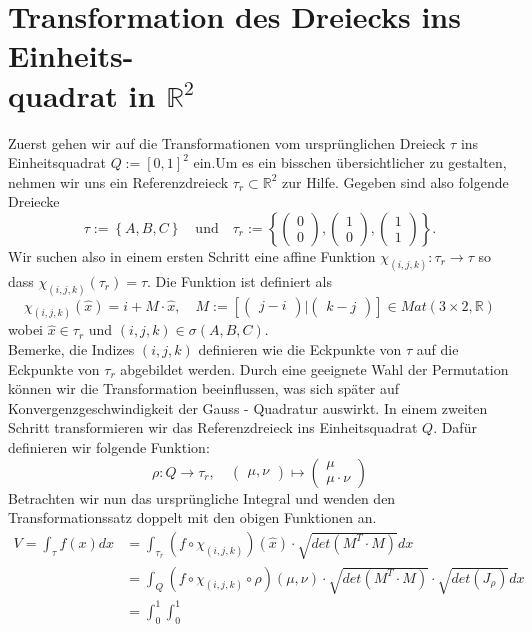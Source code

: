 \documentclass[12pt]{article}
\newcommand{\R}{\mathbb{R}}
\begin{document}
\section[Transformation des Dreiecks ins Einheitsquadrat in $\R^2$]{Transformation des Dreiecks ins Einheits-\\quadrat in $\R^2$}
Zuerst gehen wir auf die Transformationen vom ursprünglichen Dreieck $\tau$ ins Einheitsquadrat $Q:=[0,1]^2$ ein.Um es ein bisschen übersichtlicher zu gestalten, nehmen wir uns ein Referenzdreieck $\tau_r\subset\R^2$ zur Hilfe. Gegeben sind also folgende Dreiecke
\[
\tau := \left \{ A,B,C \right \}
\quad\text{und}\quad
\tau_r := \left \{ \begin{pmatrix} 0\\ 0 \end{pmatrix},
\begin{pmatrix} 1\\ 0\end{pmatrix},
\begin{pmatrix} 1\\1\end{pmatrix} \right \}.
\]
Wir suchen also in einem ersten Schritt eine affine Funktion $\chi_{(i,j,k)}:\tau_r\rightarrow\tau$ so dass $\chi_{(i,j,k)}(\tau_r)=\tau$. Die Funktion ist definiert als
\[
\chi_{(i,j,k)}(\hat{x})= i + M\cdot \hat{x}, \quad M := \left[ \begin{pmatrix} j-i \end{pmatrix} |
\begin{pmatrix} k-j \end{pmatrix} \right] \in Mat(3\times 2,\R)
\]
wobei $\hat{x}\in \tau_r$ und $(i,j,k)\in\sigma(A,B,C)$.\\
Bemerke, die Indizes $(i,j,k)$ definieren wie die Eckpunkte von $\tau$ auf die Eckpunkte von $\tau_r$ abgebildet werden. Durch eine geeignete Wahl der Permutation können wir die Transformation beeinflussen, was sich später auf Konvergenzgeschwindigkeit der Gauss - Quadratur auswirkt.
In einem zweiten Schritt transformieren wir das Referenzdreieck ins Einheitsquadrat $Q$. Dafür definieren wir folgende Funktion:
\[
\rho : Q \rightarrow \tau_r,\quad \begin{pmatrix} \mu,\nu \end{pmatrix} \mapsto
\begin{pmatrix} \mu\\\mu\cdot\nu \end{pmatrix}
\]
Betrachten wir nun das ursprüngliche Integral und wenden den Transformationssatz doppelt mit den obigen Funktionen an.
\begin{align}
V=\int_{\tau}f(x) dx &= \int_{\tau_r}(f\circ\chi_{(i,j,k)})(\hat{x}) \cdot \sqrt{det(M^T\cdot M)} dx\\
&=\int_{Q} (f\circ\chi_{(i,j,k)}\circ\rho)(\mu,\nu) \cdot \sqrt{det(M^T\cdot M)} \cdot \sqrt{det(J_\rho)} dx\\
&=\int_{0}^{1}\int_{0}^{1} 
\end{align}
\\
\end{document}
